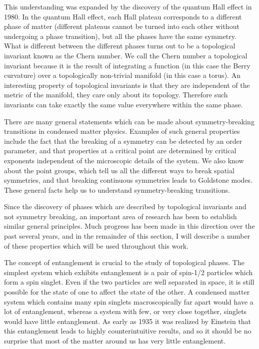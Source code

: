 This understanding was expanded by the discovery of the quantum Hall effect in 1980.\cite{klitzing} In the quantum Hall effect, each Hall plateau corresponds to a different phase of matter (different plateaus cannot be turned into each other without undergoing a phase transition), but all the phases have the same symmetry. What is different between the different phases turns out to be a topological invariant known as the Chern number. We call the Chern number a topological invariant because it is the result of integrating a function (in this case the Berry curvature) over a topologically non-trivial manifold (in this case a torus). An interesting property of topological invariants is that they are independent of the metric of the manifold, they care only about its topology. Therefore such invariants can take exactly the same value everywhere within the same phase. 

There are many general statements which can be made about symmetry-breaking transitions in condensed matter physics. 
Examples of such general properties include the fact that the breaking of a symmetry can be detected by an order parameter, and that properties at a critical point are determined by  critical exponents independent of the microscopic details of the system. We also know about the point groups, which tell us all the different ways to break spatial symmetries, and that breaking continuous symmetries leads to Goldstone modes. These general facts help us to understand symmetry-breaking transitions.

Since the discovery of phases which are described by topological invariants and not symmetry breaking, an important area of research has been to establish similar general principles. Much progress has been made in this direction over the past several years, and in the remainder of this section, I will describe a number of these properties which will be used throughout this work.

The concept of entanglement is crucial to the study of topological phases. The simplest system which exhibits entanglement is a pair of spin-1/2 particles which form a spin singlet. Even if the two particles are well separated in space, it is still possible for the state of one to affect the state of the other. A condensed matter system which contains many spin singlets macroscopically far apart would have a lot of entanglement, whereas a system with few, or very close together, singlets would have little entanglement. As early as 1935 it was realized by Einstein\cite{Einstein} that this entanglement leads to highly counterintuitive results, and so it should be no surprise that most of the matter around us has very little entanglement.

